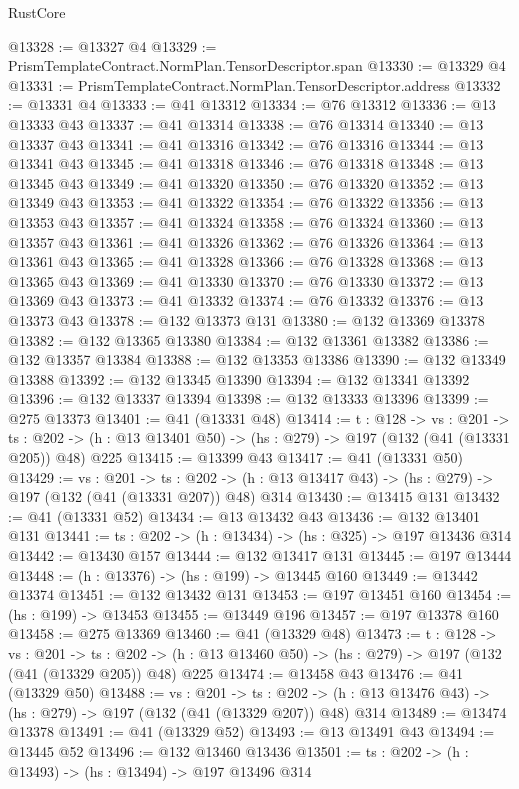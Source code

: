 \begin{lexlean}{RustCore}
\begin{coremodule}
@13328 := @13327 @4
@13329 := PrismTemplateContract.NormPlan.TensorDescriptor.span
@13330 := @13329 @4
@13331 := PrismTemplateContract.NormPlan.TensorDescriptor.address
@13332 := @13331 @4
@13333 := @41 @13312
@13334 := @76 @13312
@13336 := @13 @13333 @43
@13337 := @41 @13314
@13338 := @76 @13314
@13340 := @13 @13337 @43
@13341 := @41 @13316
@13342 := @76 @13316
@13344 := @13 @13341 @43
@13345 := @41 @13318
@13346 := @76 @13318
@13348 := @13 @13345 @43
@13349 := @41 @13320
@13350 := @76 @13320
@13352 := @13 @13349 @43
@13353 := @41 @13322
@13354 := @76 @13322
@13356 := @13 @13353 @43
@13357 := @41 @13324
@13358 := @76 @13324
@13360 := @13 @13357 @43
@13361 := @41 @13326
@13362 := @76 @13326
@13364 := @13 @13361 @43
@13365 := @41 @13328
@13366 := @76 @13328
@13368 := @13 @13365 @43
@13369 := @41 @13330
@13370 := @76 @13330
@13372 := @13 @13369 @43
@13373 := @41 @13332
@13374 := @76 @13332
@13376 := @13 @13373 @43
@13378 := @132 @13373 @131
@13380 := @132 @13369 @13378
@13382 := @132 @13365 @13380
@13384 := @132 @13361 @13382
@13386 := @132 @13357 @13384
@13388 := @132 @13353 @13386
@13390 := @132 @13349 @13388
@13392 := @132 @13345 @13390
@13394 := @132 @13341 @13392
@13396 := @132 @13337 @13394
@13398 := @132 @13333 @13396
@13399 := @275 @13373
@13401 := @41 (@13331 @48)
@13414 := {t : @128} ->
  {vs : @201} ->
  {ts : @202} -> (h : @13 @13401 @50) -> (hs : @279) -> @197 (@132 (@41 (@13331 @205)) @48) @225
@13415 := @13399 @43
@13417 := @41 (@13331 @50)
@13429 := {vs : @201} ->
  {ts : @202} -> (h : @13 @13417 @43) -> (hs : @279) -> @197 (@132 (@41 (@13331 @207)) @48) @314
@13430 := @13415 @131
@13432 := @41 (@13331 @52)
@13434 := @13 @13432 @43
@13436 := @132 @13401 @131
@13441 := {ts : @202} -> (h : @13434) -> (hs : @325) -> @197 @13436 @314
@13442 := @13430 @157
@13444 := @132 @13417 @131
@13445 := @197 @13444
@13448 := (h : @13376) -> (hs : @199) -> @13445 @160
@13449 := @13442 @13374
@13451 := @132 @13432 @131
@13453 := @197 @13451 @160
@13454 := (hs : @199) -> @13453
@13455 := @13449 @196
@13457 := @197 @13378 @160
@13458 := @275 @13369
@13460 := @41 (@13329 @48)
@13473 := {t : @128} ->
  {vs : @201} ->
  {ts : @202} -> (h : @13 @13460 @50) -> (hs : @279) -> @197 (@132 (@41 (@13329 @205)) @48) @225
@13474 := @13458 @43
@13476 := @41 (@13329 @50)
@13488 := {vs : @201} ->
  {ts : @202} -> (h : @13 @13476 @43) -> (hs : @279) -> @197 (@132 (@41 (@13329 @207)) @48) @314
@13489 := @13474 @13378
@13491 := @41 (@13329 @52)
@13493 := @13 @13491 @43
@13494 := @13445 @52
@13496 := @132 @13460 @13436
@13501 := {ts : @202} -> (h : @13493) -> (hs : @13494) -> @197 @13496 @314

\end{coremodule}
\end{lexlean}

